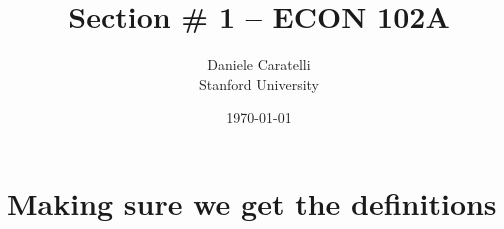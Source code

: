 \documentclass[12pt,twoside]{article}
\numberwithin{equation}{section}
\begin{document}





\title{Section \# 1 -- ECON 102A}


\author{\large Daniele Caratelli\\ {Stanford University}
}

\date{\small \today }
\maketitle
\thispagestyle{empty}

\vspace{-0.3in}

\tableofcontents

\clearpage

\section{Making sure we get the definitions}
\end{document}

